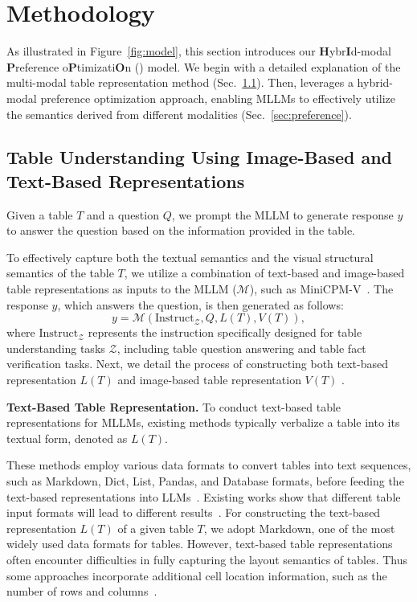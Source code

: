 \section{Methodology}
As illustrated in Figure~\ref{fig:model}, this section introduces our \textbf{H}ybr\textbf{I}d-modal \textbf{P}reference o\textbf{P}timizati\textbf{O}n (\method{}) model. We begin with a detailed explanation of the multi-modal table representation method (Sec.~\ref{sec:representation}). Then, \method{} leverages a hybrid-modal preference optimization approach, enabling MLLMs to effectively utilize the semantics derived from different modalities (Sec.~\ref{sec:preference}).

\subsection{Table Understanding Using Image-Based and Text-Based Representations}\label{sec:representation}
Given a table $T$ and a question $Q$, we prompt the MLLM to generate response $y$ to answer the question based on the information provided in the table.

To effectively capture both the textual semantics and the visual structural semantics of the table $T$, we utilize a combination of text-based and image-based table representations as inputs to the MLLM ($\mathcal{M}$), such as MiniCPM-V~\cite{yao2024minicpm}. The response $y$, which answers the question, is then generated as follows:
\begin{equation}
y = \mathcal{M} (\text{Instruct}_\mathcal{Z}, Q, L(T), V(T)), 
\end{equation}
where $\text{Instruct}_\mathcal{Z}$ represents the instruction specifically designed for table understanding tasks $\mathcal{Z}$, including table question answering and table fact verification tasks. Next, we detail the process of constructing both text-based representation $L(T)$ and image-based table representation $V(T)$ .



\textbf{Text-Based Table Representation.} To conduct text-based table representations for MLLMs, existing methods typically verbalize a table into its textual form, denoted as $L(T)$.

These methods employ various data formats to convert tables into text sequences, such as Markdown, Dict, List, Pandas, and Database formats, before feeding the text-based representations into LLMs~\cite{zhang2024flextaf}. Existing works show that different table input formats will lead to different results~\cite{wang2024chainoftable,zhang2024flextaf}. For constructing the text-based representation $L(T)$ of a given table $T$, we adopt Markdown, one of the most widely used data formats for tables.
However, text-based table representations often encounter difficulties in fully capturing the layout semantics of tables. Thus some approaches incorporate additional cell location information, such as the number of rows and columns~\cite{liu2021tapex}.



